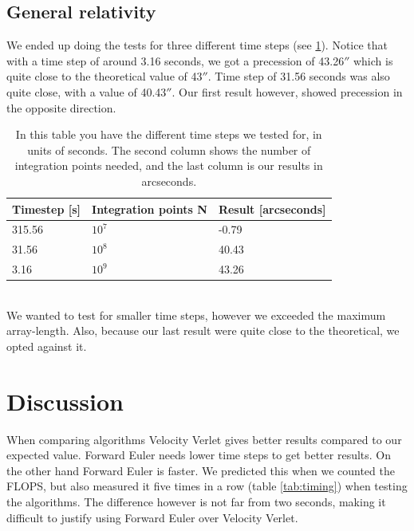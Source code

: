 \documentclass[reprint, english,notitlepage,nofootinbib]{revtex4-1}  %
\begin{document}
\subsection{General relativity}

We ended up doing the tests for three different time steps (see \ref{tab:general_relativity}). Notice that with a time step of around 3.16 seconds, we got a precession of 43.26$''$ which is quite close to the theoretical value of 43$''$. Time step of 31.56 seconds was also quite close, with a value of 40.43$''$. Our first result however, showed precession in the opposite direction.
\begin{table}[h]
	\begin{tabular}{|l|l|l|}
		\hline
		Timestep {[}s{]} & Integration points N & Result {[}arcseconds{]} \\
		\hline
		315.56              & $10^7$          & -0.79               \\
		31.56               & $10^8$          & 40.43                 \\
		3.16                & $10^9$          & 43.26	\\
		\hline
	\end{tabular}
	\caption{In this table you have the different time steps we tested for, in units of seconds. The second column shows the number of integration points needed, and the last column is our results in arcseconds.
	\label{tab:general_relativity}}
\end{table}
\\
We wanted to test for smaller time steps, however we exceeded the maximum array-length. Also, because our last result were quite close to the theoretical, we opted against it.

\clearpage
\clearpage
\clearpage
\clearpage
\section{Discussion}

When comparing algorithms Velocity Verlet gives better results compared to our expected value. Forward Euler needs lower time steps to get better results. On the other hand Forward Euler is faster. We predicted this when we counted the FLOPS, but also measured it five times in a row (table \ref{tab:timing}) when testing the algorithms. The difference however is not far from two seconds, making it difficult to justify using Forward Euler over Velocity Verlet.
\end{document}
